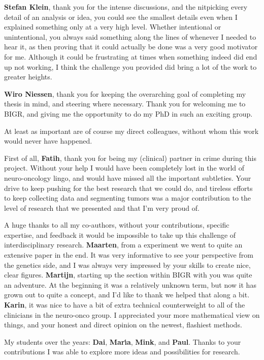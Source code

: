 \textbf{Stefan Klein}, thank you for the intense discussions, and the nitpicking every detail of an analysis or idea, you could see the smallest details even when I explained something only at a very high level.
Whether intentional or unintentional, you always said something along the lines of  whenever I needed to hear it, as then proving that it could actually be done was a very good motivator for me.
Although it could be frustrating at times when something indeed did end up not working, I think the challenge you provided did bring a lot of the work to greater heights.

\textbf{Wiro Niessen}, thank you for keeping the overarching goal of completing my thesis in mind, and steering where necessary.
Thank you for welcoming me to BIGR, and giving me the opportunity to do my PhD in such an exciting group.

At least as important are of course my direct colleagues, without whom this work would never have happened.

First of all, \textbf{Fatih}, thank you for being my (clinical) partner in crime during this project.
Without your help I would have been completely lost in the world of neuro-oncology lingo, and would have missed all the important subtleties.
Your drive to keep pushing for the best research that we could do, and tireless efforts to keep collecting data and segmenting tumors was a major contribution to the level of research that we presented and that I'm very proud of.

A huge thanks to all my co-authors, without your contributions, specific expertise, and feedback it would be impossible to take up this challenge of interdisciplinary research.
\textbf{Maarten}, from a  experiment we went to quite an extensive paper in the end.
It was very informative to see your perspective from the genetics side, and I was always very impressed by your skills to create nice, clear figures.
\textbf{Martijn}, starting up the  section within BIGR with you was quite an adventure.
At the beginning it was a relatively unknown term, but now it has grown out to quite a concept, and I'd like to thank we helped that along a bit.
\textbf{Karin}, it was nice to have a bit of extra technical counterweight to all of the clinicians in the neuro-onco group.
I appreciated your more mathematical view on things, and your honest and direct opinion on the newest, flashiest methods.

My students over the years: \textbf{Dai}, \textbf{Mar{\'\i}a}, \textbf{Mink}, and \textbf{Paul}.
Thanks to your contributions I was able to explore more ideas and possibilities for research.

